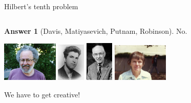 \documentclass[10pt]{beamer}
\theoremstyle{definition}
\newtheorem{answer}{Answer}
\begin{document}
\begin{frame}[t]{Hilbert's tenth problem}
\begin{columns}[T]
\end{columns}

\vspace{0.5cm}

\begin{answer}[Davis, Matiyasevich, Putnam, Robinson]
No.
\end{answer}

\begin{center}
\includegraphics[width=0.2\textwidth]{davis.jpg}
\hspace{0.5cm}
\includegraphics[width=0.1\textwidth]{matiyasevich.jpg}
\hspace{0.5cm}
\includegraphics[width=0.1\textwidth]{putnam.jpg}
\hspace{0.5cm}
\includegraphics[width=0.2\textwidth]{robinson.jpg}
\end{center}

\vspace{0.5cm} We have to get creative!

\end{frame}
\end{document}
